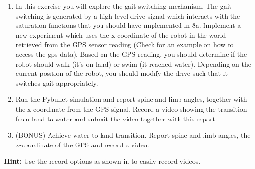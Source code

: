 \documentclass{cmc}
\begin{document}
\begin{enumerate}
\item In this exercise you will explore the gait switching mechanism. The gait
  switching is generated by a high level drive signal which interacts with the
  saturation functions that you should have implemented in 8a. Implement a new
  experiment which uses the x-coordinate of the robot in the world retrieved
  from the GPS sensor reading (Check  for an example on how
  to access the gps data). Based on the GPS reading,
  you should determine if the robot should walk (it’s on land) or swim (it
  reached water). Depending on the current position of the robot, you should
  modify the drive such that it switches gait appropriately.
\item Run the Pybullet simulation and report spine and limb angles, together with
  the x coordinate from the GPS signal. Record a video showing the transition
  from land to water and submit the video together with this report.
\item (BONUS) Achieve water-to-land transition. Report spine and limb angles,
  the x-coordinate of the GPS and record a video.
\end{enumerate}


\textbf{Hint:} Use the record options as shown in  to
easily record videos.





\label{sec:references}




\end{document}
